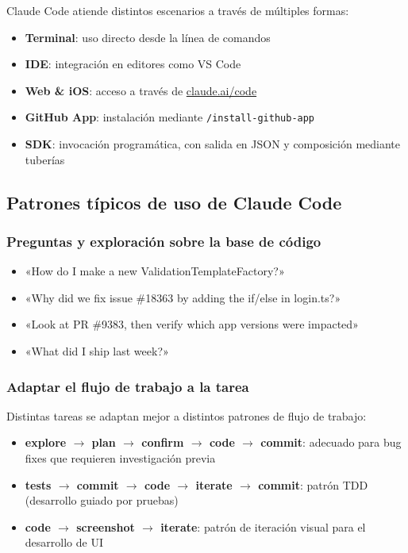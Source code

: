 Claude Code atiende distintos escenarios a través de múltiples formas:

\begin{itemize}
    \item \textbf{Terminal}: uso directo desde la línea de comandos
    \item \textbf{IDE}: integración en editores como VS Code
    \item \textbf{Web \& iOS}: acceso a través de \url{claude.ai/code}
    \item \textbf{GitHub App}: instalación mediante \texttt{/install-github-app}
    \item \textbf{SDK}: invocación programática, con salida en JSON y composición mediante tuberías
\end{itemize}

\subsection{Patrones típicos de uso de Claude Code}

\subsubsection{Preguntas y exploración sobre la base de código}

\begin{itemize}
    \item «How do I make a new ValidationTemplateFactory?»
    \item «Why did we fix issue \#18363 by adding the if/else in login.ts?»
    \item «Look at PR \#9383, then verify which app versions were impacted»
    \item «What did I ship last week?»
\end{itemize}

\subsubsection{Adaptar el flujo de trabajo a la tarea}

Distintas tareas se adaptan mejor a distintos patrones de flujo de trabajo:
\begin{itemize}
    \item \textbf{explore $\rightarrow$ plan $\rightarrow$ confirm $\rightarrow$ code $\rightarrow$ commit}: adecuado para bug fixes que requieren investigación previa
    \item \textbf{tests $\rightarrow$ commit $\rightarrow$ code $\rightarrow$ iterate $\rightarrow$ commit}: patrón TDD (desarrollo guiado por pruebas)
    \item \textbf{code $\rightarrow$ screenshot $\rightarrow$ iterate}: patrón de iteración visual para el desarrollo de UI
\end{itemize}

